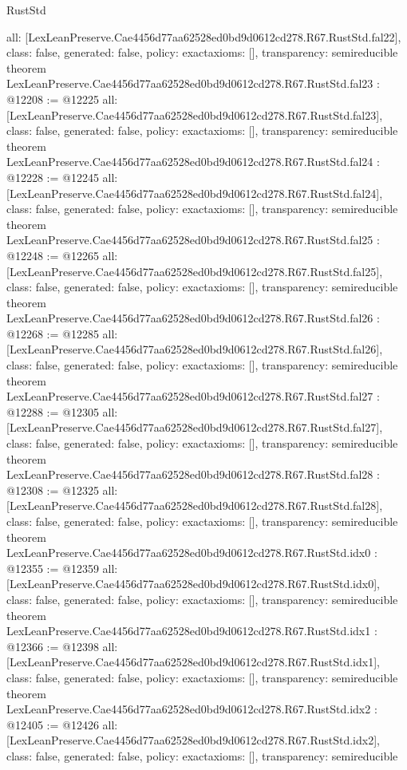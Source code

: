 \begin{lexlean}{RustStd}
\begin{coremodule}
{  all: [LexLeanPreserve.Cae4456d77aa62528ed0bd9d0612cd278.R67.RustStd.fal22],
  class: false,
  generated: false,
  policy: exact{axioms: []},
  transparency: semireducible
}
theorem LexLeanPreserve.Cae4456d77aa62528ed0bd9d0612cd278.R67.RustStd.fal23 : @12208 := @12225 {
  all: [LexLeanPreserve.Cae4456d77aa62528ed0bd9d0612cd278.R67.RustStd.fal23],
  class: false,
  generated: false,
  policy: exact{axioms: []},
  transparency: semireducible
}
theorem LexLeanPreserve.Cae4456d77aa62528ed0bd9d0612cd278.R67.RustStd.fal24 : @12228 := @12245 {
  all: [LexLeanPreserve.Cae4456d77aa62528ed0bd9d0612cd278.R67.RustStd.fal24],
  class: false,
  generated: false,
  policy: exact{axioms: []},
  transparency: semireducible
}
theorem LexLeanPreserve.Cae4456d77aa62528ed0bd9d0612cd278.R67.RustStd.fal25 : @12248 := @12265 {
  all: [LexLeanPreserve.Cae4456d77aa62528ed0bd9d0612cd278.R67.RustStd.fal25],
  class: false,
  generated: false,
  policy: exact{axioms: []},
  transparency: semireducible
}
theorem LexLeanPreserve.Cae4456d77aa62528ed0bd9d0612cd278.R67.RustStd.fal26 : @12268 := @12285 {
  all: [LexLeanPreserve.Cae4456d77aa62528ed0bd9d0612cd278.R67.RustStd.fal26],
  class: false,
  generated: false,
  policy: exact{axioms: []},
  transparency: semireducible
}
theorem LexLeanPreserve.Cae4456d77aa62528ed0bd9d0612cd278.R67.RustStd.fal27 : @12288 := @12305 {
  all: [LexLeanPreserve.Cae4456d77aa62528ed0bd9d0612cd278.R67.RustStd.fal27],
  class: false,
  generated: false,
  policy: exact{axioms: []},
  transparency: semireducible
}
theorem LexLeanPreserve.Cae4456d77aa62528ed0bd9d0612cd278.R67.RustStd.fal28 : @12308 := @12325 {
  all: [LexLeanPreserve.Cae4456d77aa62528ed0bd9d0612cd278.R67.RustStd.fal28],
  class: false,
  generated: false,
  policy: exact{axioms: []},
  transparency: semireducible
}
theorem LexLeanPreserve.Cae4456d77aa62528ed0bd9d0612cd278.R67.RustStd.idx0 : @12355 := @12359 {
  all: [LexLeanPreserve.Cae4456d77aa62528ed0bd9d0612cd278.R67.RustStd.idx0],
  class: false,
  generated: false,
  policy: exact{axioms: []},
  transparency: semireducible
}
theorem LexLeanPreserve.Cae4456d77aa62528ed0bd9d0612cd278.R67.RustStd.idx1 : @12366 := @12398 {
  all: [LexLeanPreserve.Cae4456d77aa62528ed0bd9d0612cd278.R67.RustStd.idx1],
  class: false,
  generated: false,
  policy: exact{axioms: []},
  transparency: semireducible
}
theorem LexLeanPreserve.Cae4456d77aa62528ed0bd9d0612cd278.R67.RustStd.idx2 : @12405 := @12426 {
  all: [LexLeanPreserve.Cae4456d77aa62528ed0bd9d0612cd278.R67.RustStd.idx2],
  class: false,
  generated: false,
  policy: exact{axioms: []},
  transparency: semireducible
}
\end{coremodule}
\end{lexlean}
